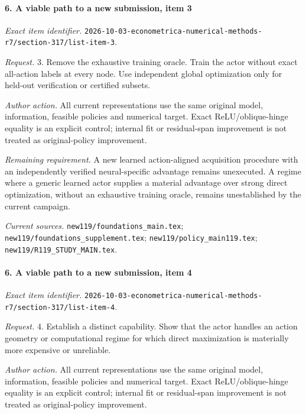 \paragraph{6. A viable path to a new submission, item 3}

\emph{Exact item identifier.} \nolinkurl{2026-10-03-econometrica-numerical-methods-r7/section-317/list-item-3}.

\par\emph{Request.} 3. Remove the exhaustive training oracle. Train the actor without exact all-action labels at every node. Use independent global optimization only for held-out verification or certified subsets.

\par\emph{Author action.} All current representations use the same original model, information, feasible policies and numerical target. Exact ReLU/\allowbreak{}oblique-hinge equality is an explicit control; internal fit or residual-span improvement is not treated as original-policy improvement.

\par\emph{Remaining requirement.} A new learned action-aligned acquisition procedure with an independently verified neural-specific advantage remains unexecuted. A regime where a generic learned actor supplies a material advantage over strong direct optimization, without an exhaustive training oracle, remains unestablished by the current campaign.

\par\emph{Current sources.} \nolinkurl{new119/foundations_main.tex}; \nolinkurl{new119/foundations_supplement.tex}; \nolinkurl{new119/policy_main119.tex}; \nolinkurl{new119/R119_STUDY_MAIN.tex}.

\paragraph{6. A viable path to a new submission, item 4}

\emph{Exact item identifier.} \nolinkurl{2026-10-03-econometrica-numerical-methods-r7/section-317/list-item-4}.

\par\emph{Request.} 4. Establish a distinct capability. Show that the actor handles an action geometry or computational regime for which direct maximization is materially more expensive or unreliable.

\par\emph{Author action.} All current representations use the same original model, information, feasible policies and numerical target. Exact ReLU/\allowbreak{}oblique-hinge equality is an explicit control; internal fit or residual-span improvement is not treated as original-policy improvement.

